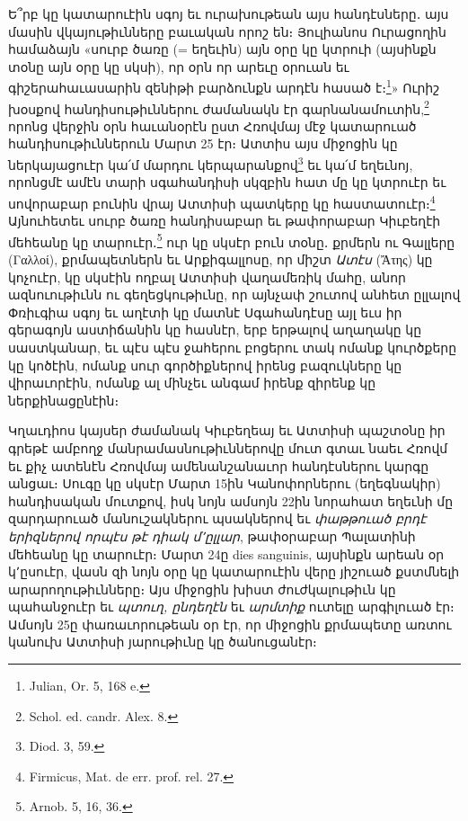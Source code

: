 \documentclass{article}
\begin{document}
{Ե՞րբ կը կատարուէին սգոյ եւ ուրախութեան այս հանդէսները․ այս մասին վկայութիւնները բաւական որոշ են։ Յուլիանոս Ուրացողին համաձայն «սուրբ ծառը (= եղեւին) այն օրը կը կտրուի (այսինքն տօնը այն օրը կը սկսի), որ օրն որ արեւը օրուան եւ գիշերահաւասարին զենիթի բարձունքն արդէն հասած է։\footnote{Julian, Or. 5, 168 e.}» Ուրիշ խօսքով հանդիսութիւններու ժամանակն էր գարնանամուտին,\footnote{Schol. ed. candr. Alex. 8.} որոնց վերջին օրն հաւանօրէն ըստ Հռովմայ մէջ կատարուած հանդիսութիւններուն Մարտ 25 էր։ Ատտիս այս միջոցին կը ներկայացուէր կա՛մ մարդու կերպարանքով\footnote{Diod. 3, 59.} եւ կա՛մ եղեւնոյ, որոնցմէ ամէն տարի սգահանդիսի սկզբին հատ մը կը կտրուէր եւ սովորաբար բունին վրայ Ատտիսի պատկերը կը հաստատուէր։\footnote{Firmicus, Mat. de err. prof. rel. 27.} Այնուհետեւ սուրբ ծառը հանդիսաբար եւ թափորաբար Կիւբեղէի մեհեանը կը տարուէր․\footnote{Arnob. 5, 16, 36.} ուր կը սկսէր բուն տօնը․ քրմերն ու Գալլերը (Γαλλοί), քրմապետներն եւ Արքիգալլոսը, որ միշտ \emph{Ատէս} (Ἄτης) կը կոչուէր, կը սկսէին ողբալ Ատտիսի վաղամեռիկ մահը, անոր ազնուութիւնն ու գեղեցկութիւնը, որ այնչափ շուտով անհետ ըլլալով Փռիւգիա սգոյ եւ աղէտի կը մատնէ Սգահանդէսը այլ եւս իր գերագոյն աստիճանին կը հասնէր, երբ երթալով աղաղակը կը սաստկանար, եւ պէս պէս ջահերու բոցերու տակ ոմանք կուրծքերը կը կոծէին, ոմանք սուր գործիքներով իրենց բազուկները կը վիրաւորէին, ոմանք ալ մինչեւ անգամ իրենք զիրենք կը ներքինացընէին։

Կղաւդիոս կայսեր ժամանակ Կիւբեղեայ եւ Ատտիսի պաշտօնը իր գրեթէ ամբողջ մանրամասնութիւններովը մուտ գտաւ նաեւ Հռովմ եւ քիչ ատենէն Հռովմայ ամենանշանաւոր հանդէսներու կարգը անցաւ։ Սուգը կը սկսէր Մարտ 15ին Կանոփորներու (եղեգնակիր) հանդիսական մուտքով, իսկ նոյն ամսոյն 22ին նորահատ եղեւնի մը զարդարուած մանուշակներու պսակներով եւ \emph{փաթթուած բրդէ երիզներով որպէս թէ դիակ մ՚ըլլար}, թափօրաբար Պալատինի մեհեանը կը տարուէր։ Մարտ 24ը dies sanguinis, այսինքն արեան օր կ՚ըսուէր, վասն զի նոյն օրը կը կատարուէին վերը յիշուած քստմնելի արարողութիւնները։ Այս միջոցին խիստ ժուժկալութիւն կը պահանջուէր եւ \emph{պտուղ, ընդեղէն} եւ \emph{արմտիք} ուտելը արգիլուած էր։ Ամսոյն 25ը փառաւորութեան օր էր, որ միջոցին քրմապետը առտու կանուխ Ատտիսի յարութիւնը կը ծանուցանէր։

}
\end{document}
